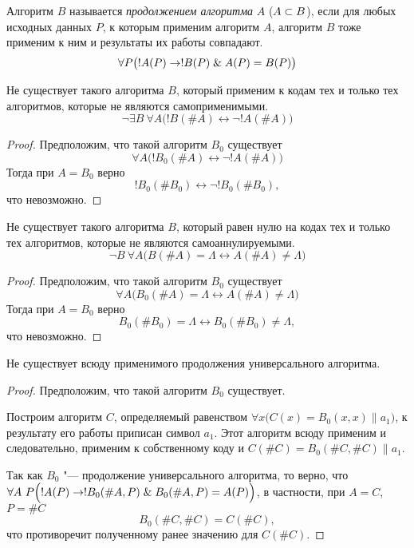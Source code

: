 \begin{definition}
	Алгоритм $ B $ называется \emph{продолжением алгоритма} $ A $ ($ A \subset B $), если для любых исходных данных $ P $, к которым применим алгоритм $ A $, алгоритм $ B $ тоже применим к ним и результаты их работы совпадают.
	$$ \forall P \bigl( !A(P) \to !B(P) \mathrel\& A(P) = B(P) \bigr) $$
\end{definition}

\begin{theorem}\label{th:auto_appl}
	Не существует такого алгоритма $ B $, который применим к кодам тех и только тех алгоритмов, которые не являются самоприменимыми.
	$$ \neg \exists B~ \forall A \bigl( !B(\#A) \leftrightarrow \neg !A(\#A) \bigr) $$
\end{theorem}

\begin{proof}
	Предположим, что такой алгоритм $ B_0 $ существует
	$$ \forall A \bigl( !B_0(\#A) \leftrightarrow \neg !A(\#A) \bigr) $$
	Тогда при $ A = B_0 $ верно
	$$ !B_0(\#B_0) \leftrightarrow \neg !B_0(\#B_0), $$
	что невозможно.
\end{proof}

\begin{theorem}\label{th:auto_annul}
	Не существует такого алгоритма $ B $, который равен нулю на кодах тех и только тех алгоритмов, которые не являются самоаннулируемыми.
	$$ \neg B ~ \forall A \bigl( B(\#A) = \Lambda \leftrightarrow A(\#A) \ne \Lambda \bigr) $$
\end{theorem}

\begin{proof}
	Предположим, что такой алгоритм $ B_0 $ существует
	$$ \forall A \bigl( B_0(\#A) = \Lambda \leftrightarrow A(\#A) \ne \Lambda \bigr) $$
	Тогда при $ A = B_0 $ верно
	$$ B_0(\#B_0) = \Lambda \leftrightarrow B_0(\#B_0) \ne \Lambda, $$
	что невозможно.
\end{proof}

\begin{theorem}\label{th:uni}
	Не существует всюду применимого продолжения универсального алгоритма.
\end{theorem}

\begin{proof}
	Предположим, что такой алгоритм $ B_0 $ существует.

	Построим алгоритм $ C $, определяемый равенством $ \forall x \bigl( C(x) = B_0(x, x) \| a_1 \bigr) $, \ie к результату его работы приписан символ $ a_1 $.
	Этот алгоритм всюду применим и следовательно, применим к собственному коду и $ C(\#C) = B_0(\#C, \#C) \| a_1 $.

	Так как $ B_0 $ "--- продолжение универсального алгоритма, то верно, что $ \forall A~P \Bigl( !A(P) \to !B_0(\#A, P) \mathrel\& B_0(\#A, P) = A(P) \Bigr) $, в частности, при $ A = C $, $ P = \#C $
	$$ B_0(\#C, \#C) = C(\#C), $$
	что противоречит полученному ранее значению для $ C(\#C) $.
\end{proof}

